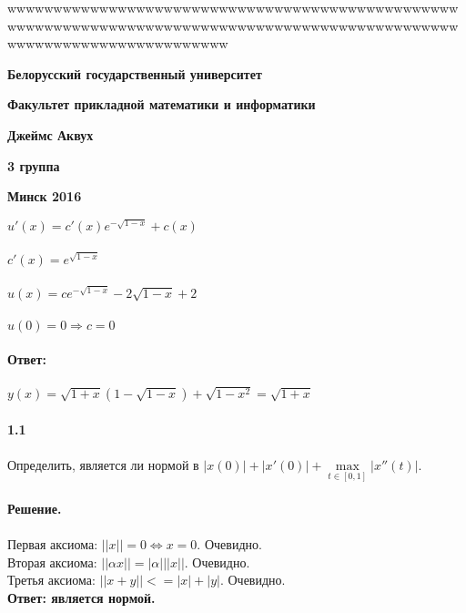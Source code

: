 \documentclass[10pt,a4paper]{article}
\begin{document}
	\begin{titlepage}wwwwwwwwwwwwwwwwwwwwwwwwwwwwwwwwwwwwwwwwwwwwwwwwwwwwwwwwwwwwwwwwwwwwwwwwwwwwwwwwwwwwwwwwwwwwwwwwwwwwwwwwwwwwwwwwwwwwwwwwww
		
		\centerline{\large \bf Белорусский государственный университет}
		\centerline{\large \bf Факультет прикладной математики и информатики}
		\vfill
		\vfill
		\vfill
		\vfill
		\vfill
		\vfill
		\centerline{\Large \bf Джеймс Аквух}
		\centerline{\Large \bf 3 группа}
		\bigskip
		\vfill
		\bigskip
		\vfill
		\vfill
		\vfill
		\hfill
		\vfill
		\vfill
		\centerline{\Large \bf Минск 2016}
	\end{titlepage}
	\noindent
	$u'(x)=c'(x)e^{-\sqrt{1-x}}+c(x)$\\ \\
	$c'(x)=e^{\sqrt{1-x}}$\\ \\
	$u(x)=ce^{-\sqrt{1-x}}-2\sqrt{1-x}+2$\\ \\
	$u(0)=0 \Rightarrow c=0$\\ \\
	\textbf{Ответ:} \\ \\
	$y(x)=\sqrt{1+x}(1-\sqrt{1-x})+\sqrt{1-x^2}=\sqrt{1+x}$\\ \\
	
	\noindent\textbf{1.1} \\  \\
	Определить, является ли нормой в $|x(0)|+|x'(0)|+\max\limits_{t\in {[0,1]}} |x''(t)|$. \\ \\
	\textbf{Решение.} \\ \\
	Первая аксиома:
	$ ||x|| = 0 \Leftrightarrow x = 0$. Очевидно. \\
	Вторая аксиома:
	$ ||\alpha x|| = |\alpha|||x||$. Очевидно.\\
	Третья аксиома:
	$||x+y||<=|x|+|y|$. Очевидно.\\
	\textbf{Ответ: является нормой.} \\ \\
	
\end{document}
